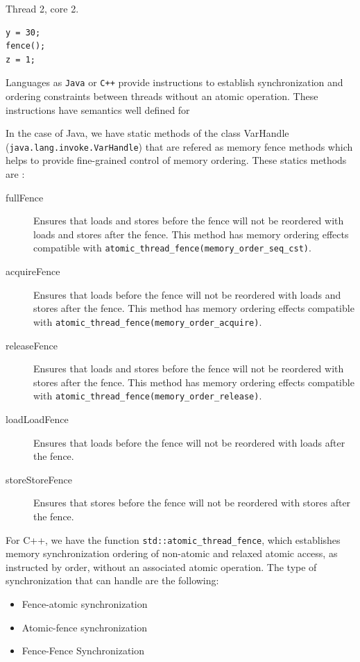 \documentclass[openany, a4paper]{book}
\theoremstyle{plain}
\theoremstyle{definition}
\theoremstyle{remark}
\begin{document}
Thread 2, core 2.
\lstset{language=c++,label= ,caption= ,captionpos=b,numbers=none}
\begin{lstlisting}
y = 30;
fence();
z = 1;
\end{lstlisting}


Languages as \texttt{Java} or \texttt{C++} provide instructions to establish synchronization
and ordering constraints between threads without an atomic operation. These
instructions have semantics well defined for

In the case of Java, we have static methods of the class VarHandle
(\texttt{java.lang.invoke.VarHandle}) that are refered as memory fence methods which
helps to provide fine-grained control of memory ordering. These statics
methods are \cite{varHandleJdk92017}:

\begin{description}
\item[{fullFence}] Ensures that loads and stores before the fence will not be
reordered with loads and stores after the fence. This method has memory
ordering effects compatible with
\texttt{atomic\_thread\_fence(memory\_order\_seq\_cst)}.
\item[{acquireFence}] Ensures that loads before the fence will not be reordered
with loads and stores after the fence. This method has memory ordering
effects compatible with \texttt{atomic\_thread\_fence(memory\_order\_acquire)}.
\item[{releaseFence}] Ensures that loads and stores before the fence will not
be reordered with stores after the fence. This method has memory ordering
effects compatible with \texttt{atomic\_thread\_fence(memory\_order\_release)}.
\item[{loadLoadFence}] Ensures that loads before the fence will not be
reordered with loads after the fence.
\item[{storeStoreFence}] Ensures that stores before the fence will not be
reordered with stores after the fence.
\end{description}

For C++, we have the function
\texttt{std::atomic\_thread\_fence}\cite{threadFenceCpp2020}, which establishes
memory synchronization ordering of non-atomic and relaxed atomic access, as
instructed by order, without an associated atomic operation. The type of
synchronization that can handle are the following:

\begin{itemize}
\item Fence-atomic synchronization
\item Atomic-fence synchronization
\item Fence-Fence Synchronization
\end{itemize}
\end{document}
